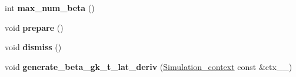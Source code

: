 \begin{DoxyCompactItemize}
\item 
\hypertarget{classsirius_1_1_beta__projectors_ad4a68db01c2fdad8a288f4c5578766c5}{}int {\bfseries max\+\_\+num\+\_\+beta} ()\label{classsirius_1_1_beta__projectors_ad4a68db01c2fdad8a288f4c5578766c5}

\item 
\hypertarget{classsirius_1_1_beta__projectors_a4896c8b509a799149c696e643d2cee42}{}void {\bfseries prepare} ()\label{classsirius_1_1_beta__projectors_a4896c8b509a799149c696e643d2cee42}

\item 
\hypertarget{classsirius_1_1_beta__projectors_ad8a6e3992b6a0f1a64d2d09c5a949c4a}{}void {\bfseries dismiss} ()\label{classsirius_1_1_beta__projectors_ad8a6e3992b6a0f1a64d2d09c5a949c4a}

\item 
\hypertarget{classsirius_1_1_beta__projectors_a71e71c7d25477396a018c46cd51743a6}{}void {\bfseries generate\+\_\+beta\+\_\+gk\+\_\+t\+\_\+lat\+\_\+deriv} (\hyperlink{classsirius_1_1_simulation__context}{Simulation\+\_\+context} const \&ctx\+\_\+\+\_\+)\label{classsirius_1_1_beta__projectors_a71e71c7d25477396a018c46cd51743a6}

\end{DoxyCompactItemize}
